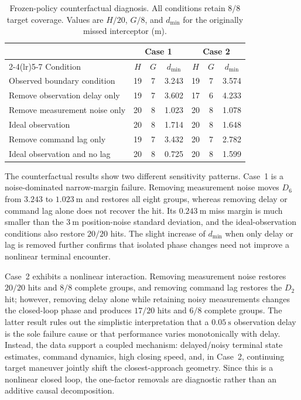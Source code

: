 \documentclass[10pt]{article}
\begin{document}
\begin{table}[H]
  \centering
  \caption{Frozen-policy counterfactual diagnosis. All conditions retain
  \(8/8\) target coverage. Values are \(H/20\), \(G/8\), and
  \(d_{\min}\) for the originally missed interceptor (m).}
  \label{tab:counterfactual}
  \small
  \setlength{\tabcolsep}{5.0pt}
  \renewcommand{\arraystretch}{1.13}
  \begin{tabular}{lcccccc}
    \toprule
    & \multicolumn{3}{c}{Case 1} & \multicolumn{3}{c}{Case 2} \\
    \cmidrule(lr){2-4}\cmidrule(lr){5-7}
    Condition & \(H\) & \(G\) & \(d_{\min}\) &
                \(H\) & \(G\) & \(d_{\min}\) \\
    \midrule
    Observed boundary condition     & 19 & 7 & 3.243 & 19 & 7 & 3.574 \\
    Remove observation delay only  & 19 & 7 & 3.602 & 17 & 6 & 4.233 \\
    Remove measurement noise only  & 20 & 8 & 1.023 & 20 & 8 & 1.078 \\
    Ideal observation              & 20 & 8 & 1.714 & 20 & 8 & 1.648 \\
    Remove command lag only        & 19 & 7 & 3.432 & 20 & 7 & 2.782 \\
    Ideal observation and no lag   & 20 & 8 & 0.725 & 20 & 8 & 1.599 \\
    \bottomrule
  \end{tabular}
\end{table}

The counterfactual results show two different sensitivity patterns. Case~1 is
a noise-dominated narrow-margin failure. Removing measurement noise moves
\(D_6\) from \(3.243\) to \(1.023~\mathrm{m}\) and restores all eight groups,
whereas removing delay or command lag alone does not recover the hit. Its
\(0.243~\mathrm{m}\) miss margin is much smaller than the \(3~\mathrm{m}\)
position-noise standard deviation, and the ideal-observation conditions also
restore \(20/20\) hits. The slight increase of \(d_{\min}\) when only delay or
lag is removed further confirms that isolated phase changes need not improve
a nonlinear terminal encounter.

Case~2 exhibits a nonlinear interaction. Removing measurement noise restores
\(20/20\) hits and \(8/8\) complete groups, and removing command lag restores
the \(D_2\) hit; however, removing delay alone while retaining noisy
measurements changes the closed-loop phase and produces \(17/20\) hits and
\(6/8\) complete groups. The latter result rules out the simplistic
interpretation that a \(0.05~\mathrm{s}\) observation delay is the sole
failure cause or that performance varies monotonically with delay. Instead,
the data support a coupled mechanism: delayed/noisy terminal state estimates,
command dynamics, high closing speed, and, in Case~2, continuing target
maneuver jointly shift the closest-approach geometry. Since this is a
nonlinear closed loop, the one-factor removals are diagnostic rather than an
additive causal decomposition.
\end{document}

